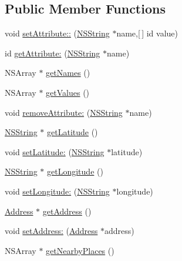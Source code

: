 \subsection*{\-Public \-Member \-Functions}
\begin{DoxyCompactItemize}
\item 
void \hyperlink{interface_location_context_a725cebb7c2bd6677244c20d99579b032}{set\-Attribute\-::} (\hyperlink{class_n_s_string}{\-N\-S\-String} $\ast$name,\mbox{[}$\,$\mbox{]} id value)
\item 
id \hyperlink{interface_location_context_ad318dfcbe51a10e0178717a5c836fdfe}{get\-Attribute\-:} (\hyperlink{class_n_s_string}{\-N\-S\-String} $\ast$name)
\item 
\-N\-S\-Array $\ast$ \hyperlink{interface_location_context_a388d22c37b5b0456c72fac7805406d4a}{get\-Names} ()
\item 
\-N\-S\-Array $\ast$ \hyperlink{interface_location_context_af0c9729fa5e345f77019410a02f0c134}{get\-Values} ()
\item 
void \hyperlink{interface_location_context_a0b9927043af28b5f4a3e5da7dc293311}{remove\-Attribute\-:} (\hyperlink{class_n_s_string}{\-N\-S\-String} $\ast$name)
\item 
\hyperlink{class_n_s_string}{\-N\-S\-String} $\ast$ \hyperlink{interface_location_context_a4bb850c18e5e860b4fcee22d4f7f3a27}{get\-Latitude} ()
\item 
void \hyperlink{interface_location_context_ab02eaba1550c9c3ff0eb20e7505ede83}{set\-Latitude\-:} (\hyperlink{class_n_s_string}{\-N\-S\-String} $\ast$latitude)
\item 
\hyperlink{class_n_s_string}{\-N\-S\-String} $\ast$ \hyperlink{interface_location_context_a66768bffca9946732cda71adb657ead0}{get\-Longitude} ()
\item 
void \hyperlink{interface_location_context_af2f0949ef70cebabfc09f55f74e100fc}{set\-Longitude\-:} (\hyperlink{class_n_s_string}{\-N\-S\-String} $\ast$longitude)
\item 
\hyperlink{interface_address}{\-Address} $\ast$ \hyperlink{interface_location_context_a2a5deb24e8e0f157154a58aaef90a395}{get\-Address} ()
\item 
void \hyperlink{interface_location_context_aab4a3460ecd379896f5d56b889354e3d}{set\-Address\-:} (\hyperlink{interface_address}{\-Address} $\ast$address)
\item 
\-N\-S\-Array $\ast$ \hyperlink{interface_location_context_adb866eee7574669f0c671a60e6f77fd5}{get\-Nearby\-Places} ()
\item 

\end{DoxyCompactItemize}
